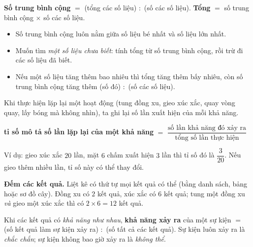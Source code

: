 \begin{knowbox}
\textbf{Số trung bình cộng} $=$ (tổng các số liệu) $:$ (số các số liệu). \qquad \textbf{Tổng} $=$ số trung bình cộng $\times$ số các số liệu.
\begin{itemize}[leftmargin=1.4em,itemsep=3pt]
\item Số trung bình cộng luôn nằm giữa số liệu bé nhất và số liệu lớn nhất.
\item Muốn tìm \emph{một số liệu chưa biết}: tính tổng từ số trung bình cộng, rồi trừ đi các số liệu đã biết.
\item Nếu một số liệu tăng thêm bao nhiêu thì tổng tăng thêm bấy nhiêu, còn số trung bình cộng tăng thêm (số đó) $:$ (số các số liệu).
\end{itemize}
\end{knowbox}
\begin{knowbox}
Khi thực hiện lặp lại một hoạt động (tung đồng xu, gieo xúc xắc, quay vòng quay, lấy bóng mà không nhìn), ta ghi lại số lần xuất hiện của mỗi khả năng.
\begin{center}
\textbf{tỉ số mô tả số lần lặp lại của một khả năng} $=$ $\dfrac{\text{số lần khả năng đó xảy ra}}{\text{tổng số lần thực hiện}}$
\end{center}
Ví dụ: gieo xúc xắc $20$ lần, mặt $6$ chấm xuất hiện $3$ lần thì tỉ số đó là $\dfrac{3}{20}$. Nếu gieo thêm nhiều lần, tỉ số này có thể thay đổi.\par\smallskip
\textbf{Đếm các kết quả.} Liệt kê có thứ tự mọi kết quả có thể (bằng danh sách, bảng hoặc sơ đồ cây). Đồng xu có $2$ kết quả, xúc xắc có $6$ kết quả; tung một đồng xu \emph{và} gieo một xúc xắc thì có $2\times6=12$ kết quả.\par
Khi các kết quả có \emph{khả năng như nhau}, \textbf{khả năng xảy ra} của một sự kiện $=$ (số kết quả làm sự kiện xảy ra) $:$ (số tất cả các kết quả). Sự kiện luôn xảy ra là \emph{chắc chắn}; sự kiện không bao giờ xảy ra là \emph{không thể}.
\end{knowbox}
\gap
